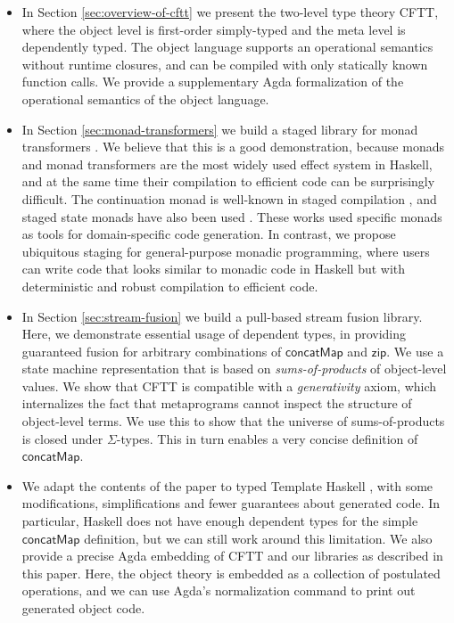 \documentclass[acmsmall]{acmart}
\newcommand{\mit}[1]{{\mathsf{#1}}}
\newcommand{\msf}[1]{{\mathsf{#1}}}
\newcommand{\concatMap}{\msf{concatMap}}
\theoremstyle{remark}
\begin{document}
\begin{itemize}
\item In Section \ref{sec:overview-of-cftt} we present the two-level type theory
  CFTT, where the object level is first-order simply-typed and the meta level is
  dependently typed. The object language supports an operational semantics
  without runtime closures, and can be compiled with only statically known
  function calls. We provide a supplementary Agda formalization of the
  operational semantics of the object language.
\item
  In Section \ref{sec:monad-transformers} we build a staged library for monad
  transformers \cite{DBLP:conf/popl/LiangHJ95}. We believe that this is a good
  demonstration, because monads and monad transformers are the most widely used
  effect system in Haskell, and at the same time their compilation to efficient
  code can be surprisingly difficult. The continuation monad is well-known in
  staged compilation \cite{DBLP:conf/lfp/Bondorf92}, and staged state monads
  have also been used
  \cite{DBLP:conf/pepm/SwadiTKP06,DBLP:conf/emsoft/KiselyovST04,DBLP:journals/scp/CaretteK11}.
  These works used specific monads as tools for domain-specific code
  generation. In contrast, we propose ubiquitous staging for general-purpose
  monadic programming, where users can write code that looks similar to monadic
  code in Haskell but with deterministic and robust compilation to efficient
  code.
\item In Section \ref{sec:stream-fusion} we build a pull-based stream fusion library. Here,
  we demonstrate essential usage of dependent types, in providing guaranteed
  fusion for arbitrary combinations of $\concatMap$ and $\mit{zip}$. We use a
  state machine representation that is based on \emph{sums-of-products} of
  object-level values. We show that CFTT is compatible with a
  \emph{generativity} axiom, which internalizes the fact that metaprograms
  cannot inspect the structure of object-level terms. We use this to show that
  the universe of sums-of-products is closed under $\Sigma$-types. This in turn
  enables a very concise definition of $\concatMap$.
\item
  We adapt the contents of the paper to typed Template Haskell
  \cite{DBLP:journals/pacmpl/XiePLWYW22}, with some modifications,
  simplifications and fewer guarantees about generated code.  In particular,
  Haskell does not have enough dependent types for the simple $\concatMap$
  definition, but we can still work around this limitation. We also provide a
  precise Agda embedding of CFTT and our libraries as described in this
  paper. Here, the object theory is embedded as a collection of postulated
  operations, and we can use Agda's normalization command to print out generated
  object code.
\end{itemize}
\end{document}
